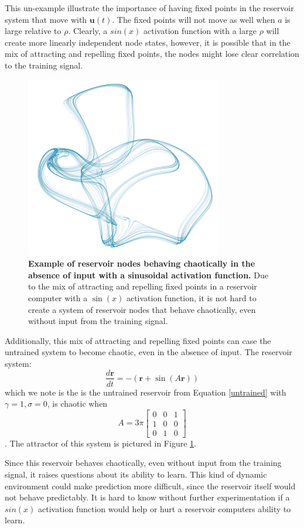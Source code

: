 \documentclass[journal]{journal}
\begin{document}
This un-example illustrate the importance of having fixed points in the reservoir system that move with $\mathbf{u}(t)$. The fixed points will not move as well when $a$ is large relative to $\rho$. Clearly, a $sin(x)$ activation function with a large $\rho$ will create more linearly independent node states, however, it is possible that in the mix of attracting and repelling fixed points, the nodes might lose clear correlation to the training signal.
\begin{figure}\label{sinattractor}
\centering
\includegraphics[scale=0.35]{Images/sinattractor.png}
\caption{\textbf{Example of reservoir nodes behaving chaotically in the absence of input with a sinusoidal activation function.} Due to the mix of attracting and repelling fixed points in a reservoir computer with a $\sin(x)$ activation function, it is not hard to create a system of reservoir nodes that behave chaotically, even without input from the training signal.}
\end{figure}
 Additionally, this mix of attracting and repelling fixed points can case the untrained system to become chaotic, even in the absence of input. The reservoir system:
 \[
\frac{d\mathbf{r}}{dt} =  -(\mathbf{r} + \sin(A\mathbf{r}))
 \] which we note is the is the untrained reservoir from Equation \ref{untrained} with $\gamma = 1, \sigma = 0$, is chaotic when 
 \[
 A = 3\pi \begin{bmatrix}
 0 & 0 & 1 \\
 1 & 0 & 0 \\
 0 & 1 & 0
 \end{bmatrix}
 \]. 
 The attractor of this system is pictured in Figure \ref{sinattractor}.
 
Since this reservoir behaves chaotically, even without input from the training  signal, it raises questions about its ability to learn. This kind of dynamic environment could make prediction more difficult, since the reservoir itself would not behave predictably. It is hard to know without further experimentation if a $sin(x)$ activation function would help or hurt a reservoir computers ability to learn.
\end{document}
